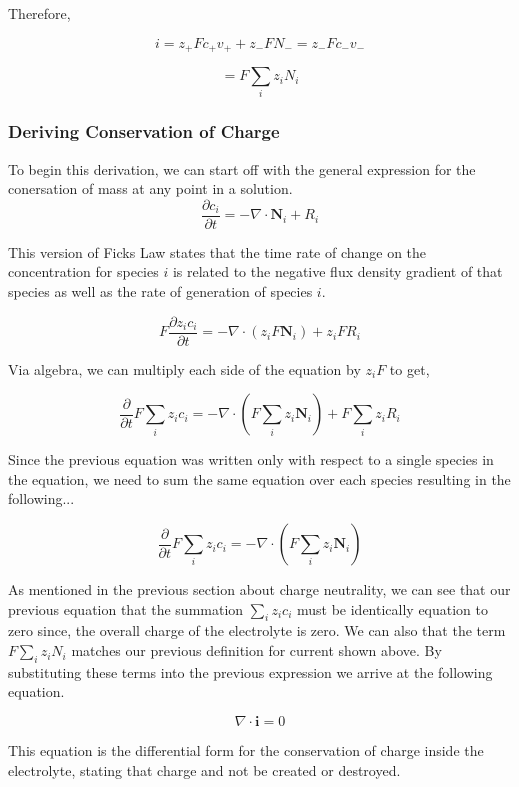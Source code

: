 \documentclass[lettersize,journal]{IEEEtran}
\begin{document}
Therefore,

\[
  i = z_{+}Fc_{+}v_{+} + z_- FN_- = z_{-}Fc_{-}v_{-}
\]

\[
  = F\sum_{i}z_{i}N_{i}
\]






\subsubsection{ Deriving Conservation of Charge }

To begin this derivation, we can start off with the general expression for the conersation of mass at any point in a solution.
\[
\frac{\partial c_{i}}{\partial t}=-\nabla \cdot \mathbf{N}_{i}+R_{i}
\]

This version of Ficks Law states that the time rate of change on the concentration for species $i$ is related to the negative flux density gradient of that species as well as the rate of generation of species $i$.

\[
F \frac{\partial z_{i} c_{i}}{\partial t}=-\nabla \cdot\left(z_{i} F \mathbf{N}_{i}\right)+z_{i} F R_{i}
\]

Via algebra, we can multiply each side of the equation by $z_{i}F$ to get,

\[
\frac{\partial}{\partial t} F \sum_{i} z_{i} c_{i}=-\nabla \cdot\left(F \sum_{i} z_{i} \mathbf{N}_{i}\right)+F \sum_{i} z_{i} R_{i}
\]

Since the previous equation was written only with respect to a single species in the equation, we need to sum the same equation over each species resulting in the following...

\[
\frac{\partial}{\partial t} F \sum_{i} z_{i} c_{i}=-\nabla \cdot\left(F \sum_{i} z_{i} \mathbf{N}_{i}\right)
\]

As mentioned in the previous section about charge neutrality, we can see that our previous equation that the summation $\sum_{i}z_{i}c_{i}$ must be identically equation to zero since, the overall charge of the electrolyte is zero. We can also that the term $F\sum_{i}z_{i}N_{i}$ matches our previous definition for current shown above. By substituting these terms into the previous expression we arrive at the following equation.

\[
\nabla \cdot \mathbf{i}=0
\]


This equation is the differential form for the conservation of charge inside the electrolyte, stating that charge and not be created or destroyed.
\end{document}
